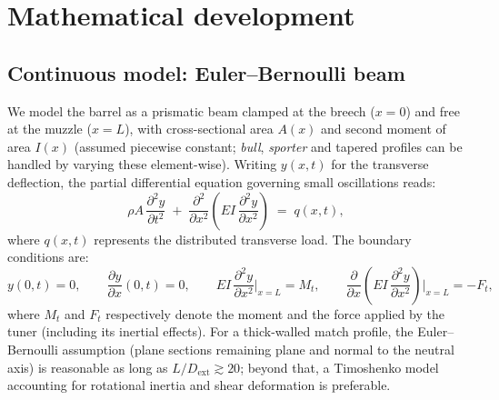 \documentclass[12pt,a4paper]{article}
\begin{document}
	\section{Mathematical development}
	\label{sec:math}

	\subsection{Continuous model: Euler--Bernoulli beam}

	We model the barrel as a prismatic beam clamped at the breech ($x=0$) and free at the muzzle ($x=L$), with cross-sectional area $A(x)$ and second moment of area $I(x)$ (assumed piecewise constant; \emph{bull}, \emph{sporter} and tapered profiles can be handled by varying these element-wise). Writing $y(x,t)$ for the transverse deflection, the partial differential equation governing small oscillations reads:
	\begin{equation}
		\label{eq:EB}
		\rho A \,\frac{\partial^2 y}{\partial t^2} \;+\; \frac{\partial^2}{\partial x^2}\!\left(EI \,\frac{\partial^2 y}{\partial x^2}\right) \;=\; q(x,t),
	\end{equation}
	where $q(x,t)$ represents the distributed transverse load. The boundary conditions are:
	\begin{equation*}
		y(0,t) = 0,\qquad \frac{\partial y}{\partial x}(0,t) = 0,\qquad EI\,\frac{\partial^2 y}{\partial x^2}\bigg|_{x=L}\!\! = M_t,\qquad \frac{\partial}{\partial x}\!\left(EI\,\frac{\partial^2 y}{\partial x^2}\right)\bigg|_{x=L}\!\! = -F_t,
	\end{equation*}
	where $M_t$ and $F_t$ respectively denote the moment and the force applied by the tuner (including its inertial effects). For a thick-walled match profile, the Euler--Bernoulli assumption (plane sections remaining plane and normal to the neutral axis) is reasonable as long as $L/D_\text{ext} \gtrsim 20$; beyond that, a Timoshenko model accounting for rotational inertia and shear deformation is preferable.
\end{document}
